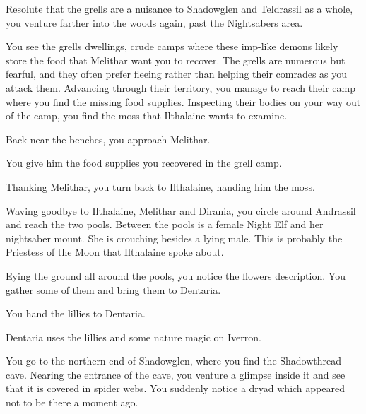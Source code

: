 
Resolute that the grells are a nuisance to Shadowglen and Teldrassil as a whole, you venture farther into the woods again, past the Nightsabers area.

You see the grells dwellings, crude camps where these imp-like demons likely store the food that Melithar want you to recover. The grells are numerous but fearful, and they often prefer fleeing rather than helping their comrades as you attack them. Advancing through their territory, you manage to reach their camp where you find the missing food supplies. Inspecting their bodies on your way out of the camp, you find the moss that Ilthalaine wants to examine.

Back near the benches, you approach Melithar.


You give him the food supplies you recovered in the grell camp.


Thanking Melithar, you turn back to Ilthalaine, handing him the moss.



Waving goodbye to Ilthalaine, Melithar and Dirania, you circle around Andrassil and reach the two pools. Between the pools is a female Night Elf and her nightsaber mount. She is crouching besides a lying male. This is probably the Priestess of the Moon that Ilthalaine spoke about.



Eying the ground all around the pools, you notice the flowers description. You gather some of them and bring them to Dentaria.


You hand the lillies to Dentaria.


Dentaria uses the lillies and some nature magic on Iverron.



You go to the northern end of Shadowglen, where you find the Shadowthread cave. Nearing the entrance of the cave, you venture a glimpse inside it and see that it is covered in spider webs. You suddenly notice a dryad which appeared not to be there a moment ago. %

